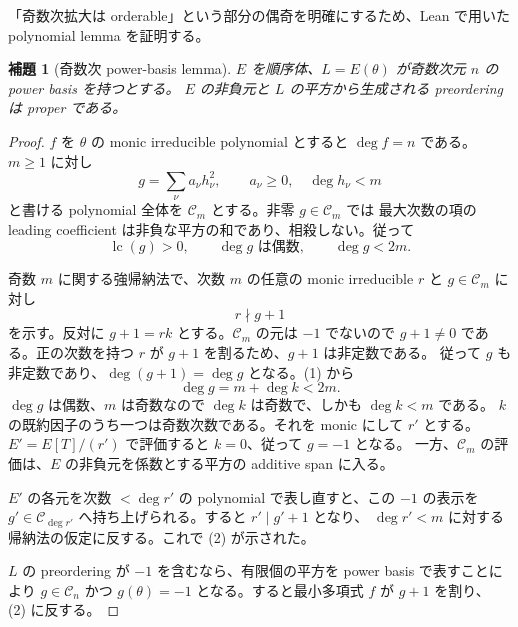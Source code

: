 \documentclass[uplatex,dvipdfmx]{jsarticle}
\newtheorem{lemma}[theorem]{補題}
\theoremstyle{definition}
\theoremstyle{remark}
\begin{document}
「奇数次拡大は orderable」という部分の偶奇を明確にするため、Lean で用いた
polynomial lemma を証明する。

\begin{lemma}[奇数次 power-basis lemma]\label{lem:odd-power-basis-ja}
$E$ を順序体、$L=E(\theta)$ が奇数次元 $n$ の power basis を持つとする。
$E$ の非負元と $L$ の平方から生成される preordering は proper である。
\end{lemma}
\begin{proof}
$f$ を $\theta$ の monic irreducible polynomial とすると $\deg f=n$ である。
$m\ge1$ に対し
\[
  g=\sum_\nu a_\nu h_\nu^2,\qquad
  a_\nu\ge0,\quad \deg h_\nu<m
\]
と書ける polynomial 全体を $\mathcal C_m$ とする。非零 $g\in\mathcal C_m$ では
最大次数の項の leading coefficient は非負な平方の和であり、相殺しない。従って
\[
  \operatorname{lc}(g)>0,\qquad
  \deg g\text{ は偶数},\qquad
  \deg g<2m.                                           \tag{1}
\]

奇数 $m$ に関する強帰納法で、次数 $m$ の任意の monic irreducible $r$ と
$g\in\mathcal C_m$ に対し
\[
  r\nmid g+1                                           \tag{2}
\]
を示す。反対に $g+1=rk$ とする。$\mathcal C_m$ の元は $-1$ でないので
$g+1\ne0$ である。正の次数を持つ $r$ が $g+1$ を割るため、$g+1$ は非定数である。
従って $g$ も非定数であり、$\deg(g+1)=\deg g$ となる。(1) から
\[
  \deg g=m+\deg k<2m.
\]
$\deg g$ は偶数、$m$ は奇数なので $\deg k$ は奇数で、しかも $\deg k<m$ である。
$k$ の既約因子のうち一つは奇数次数である。それを monic にして $r'$ とする。
$E'=E[T]/(r')$ で評価すると $k=0$、従って $g=-1$ となる。
一方、$\mathcal C_m$ の評価は、$E$ の非負元を係数とする平方の additive span に入る。

$E'$ の各元を次数 $<\deg r'$ の polynomial で表し直すと、この $-1$ の表示を
$g'\in\mathcal C_{\deg r'}$ へ持ち上げられる。すると $r'\mid g'+1$ となり、
$\deg r'<m$ に対する帰納法の仮定に反する。これで (2) が示された。

$L$ の preordering が $-1$ を含むなら、有限個の平方を power basis で表すことにより
$g\in\mathcal C_n$ かつ $g(\theta)=-1$ となる。すると最小多項式 $f$ が $g+1$ を割り、
(2) に反する。
\end{proof}
\end{document}
